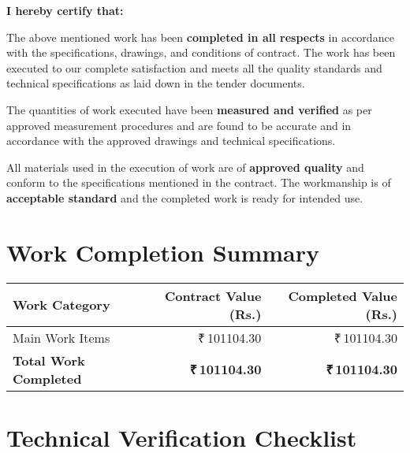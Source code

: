 \documentclass[12pt,a4paper]{article}
\newcommand{\rupees}[1]{₹\,#1}
\begin{document}
\begin{center}
{\begin{minipage}{0.95\textwidth}
\begin{center}
\textbf{\Large I hereby certify that:}
\end{center}

\vspace{0.5cm}

The above mentioned work has been \textbf{completed in all respects} in accordance with the specifications, drawings, and conditions of contract. The work has been executed to our complete satisfaction and meets all the quality standards and technical specifications as laid down in the tender documents.

\vspace{0.5cm}

The quantities of work executed have been \textbf{measured and verified} as per approved measurement procedures and are found to be accurate and in accordance with the approved drawings and technical specifications.

\vspace{0.5cm}

All materials used in the execution of work are of \textbf{approved quality} and conform to the specifications mentioned in the contract. The workmanship is of \textbf{acceptable standard} and the completed work is ready for intended use.

\vspace{1cm}
\section*{Work Completion Summary}

\begin{center}
\begin{tabular}{|l|r|r|}
\hline
\rowcolor{certblue!20}
\textbf{Work Category} & \textbf{Contract Value (Rs.)} & \textbf{Completed Value (Rs.)} \\
\hline
Main Work Items & \rupees{101104.30} & \rupees{101104.30} \\
\hline
\rowcolor{approvedgreen!20}
\textbf{Total Work Completed} & \textbf{\rupees{101104.30}} & \textbf{\rupees{101104.30}} \\
\hline
\end{tabular}
\end{center}

\vspace{1cm}
\section*{Technical Verification Checklist}


\end{minipage}}
\end{center}
\end{document}
